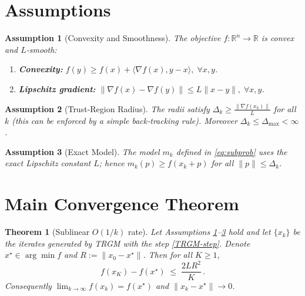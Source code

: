 \documentclass{article}
\newtheorem{theorem}{Theorem}
\newtheorem{assumption}{Assumption}
\begin{document}
\section*{Assumptions}
\begin{assumption}[Convexity and Smoothness]\label{ass:convexsmooth}
The objective $f:\mathbb{R}^n\to\mathbb{R}$ is convex and $L$‑smooth:
\begin{enumerate}
\item \textbf{Convexity:} $f(y)\ge f(x)+\langle\nabla f(x),y-x\rangle,\;\forall x,y$.
\item \textbf{Lipschitz gradient:} $\|\nabla f(x)-\nabla f(y)\|\le L\|x-y\|,\;\forall x,y$.
\end{enumerate}
\end{assumption}
\begin{assumption}[Trust‑Region Radius]\label{ass:radius}
The radii satisfy $\Delta_k\ge \frac{\|\nabla f(x_k)\|}{L}$ for all $k$ (this can be enforced by a simple back‑tracking rule). Moreover $\Delta_k\le\Delta_{\max}<\infty$.
\end{assumption}
\begin{assumption}[Exact Model]\label{ass:model}
The model $m_k$ defined in \eqref{eq:subprob} uses the exact Lipschitz constant $L$; hence $m_k(p)\ge f(x_k+p)$ for all $\|p\|\le\Delta_k$.
\end{assumption}

\section*{Main Convergence Theorem}
\begin{theorem}[Sublinear $O(1/k)$ rate]\label{thm:rate}
Let Assumptions \ref{ass:convexsmooth}–\ref{ass:model} hold and let $\{x_k\}$ be the iterates generated by TRGM with the step \eqref{TRGM‑step}. Denote $x^\star\in\arg\min f$ and $R:=\|x_0-x^\star\|$. Then for all $K\ge1$,
\[
f(x_K)-f(x^\star)\;\le\;\frac{2L R^{2}}{K}\, .
\]
Consequently $\displaystyle\lim_{k\to\infty}f(x_k)=f(x^\star)$ and $\|x_k-x^\star\|\to0$.
\end{theorem}
\end{document}
